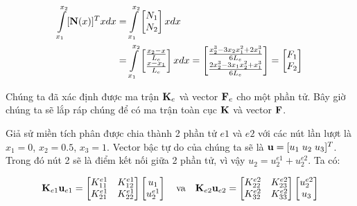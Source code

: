 \begin{equation}
    \begin{aligned}
        \int\limits_{x_1}^{x_2} [{\bf N}(x)]^Tx dx &= \int\limits_{x_1}^{x_2} \begin{bmatrix}
            N_1 \\ N_2
        \end{bmatrix}x dx \\
        & = \int\limits_{x_1}^{x_2}\begin{bmatrix}
            \frac{x_2-x}{L_e} \\ \frac{x-x_1}{L_e}
        \end{bmatrix}x dx = \begin{bmatrix}
            \frac{x_2^3-3x_2x_1^2+2x_1^3}{6L_e} \\ \frac{2x_2^3-3x_1x_2^2+x_1^3}{6L_e}
        \end{bmatrix} = \begin{bmatrix}
            F_1 \\ F_2
        \end{bmatrix}
    \end{aligned}
\end{equation}

Chúng ta đã xác định được ma trận ${\bf K}_e$ và vector ${\bf F}_e$ cho một phần tử. Bây giờ chúng ta sẽ lắp ráp chúng để có ma trận toàn cục ${\bf K}$ và vector ${\bf F}$.

Giả sử miền tích phân được chia thành 2 phần tử $e1$ và $e2$ với các nút lần lượt là $x_1 = 0$, $x_2 = 0.5$, $x_3 = 1$. Vector bậc tự do của chúng ta sẽ là ${\bf u} = [u_1 \; u_2 \; u_3]^T$. Trong đó nút 2 sẽ là điểm kết nối giữa 2 phần tử, vì vậy $u_2 = u_2^{e1} + u_2^{e2}$. Ta có:

\begin{equation}
    {\bf K}_{e1}{\bf u}_{e1} = \begin{bmatrix}
        K_{11}^{e1} & K_{12}^{e1} \\
        K_{21}^{e1} & K_{22}^{e1}
    \end{bmatrix}\begin{bmatrix}
        u_1 \\ u_2^{e1}
    \end{bmatrix} \quad \hbox{va} \quad {\bf K}_{e2}{\bf u}_{e2} = \begin{bmatrix}
        K_{22}^{e2} & K_{23}^{e2} \\
        K_{32}^{e2} & K_{33}^{e2}
    \end{bmatrix}\begin{bmatrix}
        u_2^{e2} \\ u_3
    \end{bmatrix}
\end{equation}

